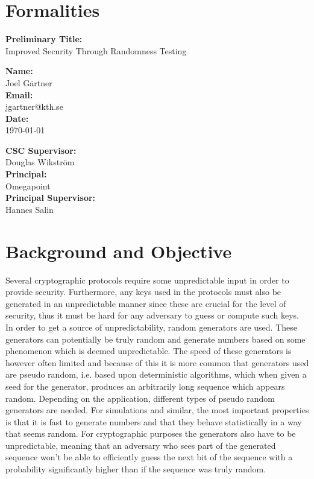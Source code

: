 \documentclass[a4paper,11pt]{report}
\begin{document}
\section*{Formalities}
\begin{center}
\textbf{Preliminary Title:}\\ Improved Security Through Randomness Testing
\end{center}

\begin{minipage}[t]{7cm}
\textbf{Name:}\\ Joel Gärtner\\
\textbf{Email:}\\ jgartner@kth.se\\
\textbf{Date:}\\ \today
\end{minipage}
\begin{minipage}[t]{7cm}
\textbf{CSC Supervisor:}\\ Douglas Wikström \\
\textbf{Principal:}\\
Omegapoint \\
\textbf{Principal Supervisor:}\\
 Hannes Salin\\
\end{minipage}
\section*{Background and Objective}
Several cryptographic protocols require some unpredictable input
in order to provide security. Furthermore, any keys used in the protocols 
must also be generated in an unpredictable manner since these are crucial for 
the level of security, thus it must be hard for any adversary to guess or 
compute such keys. In order to get a source of unpredictability,
random generators are used.  These generators can potentially 
be truly random and generate numbers based on some phenomenon which is deemed 
unpredictable. The speed of these generators is however often limited and because
of this it is more common that generators used are pseudo random, i.e.
based upon deterministic algorithms, which when given a seed for the generator,
produces an arbitrarily long sequence which appears random.
Depending on the application, different types of pseudo random generators
are needed. For simulations and similar, the most important properties 
is that it is fast to generate numbers and that they behave statistically
in a way that seems random. For cryptographic purposes the generators 
also have to be unpredictable, meaning that an adversary who sees part
of the generated sequence won't be able to efficiently guess the next bit 
of the sequence with a probability significantly higher than if the sequence 
was truly random. \\
\end{document}
